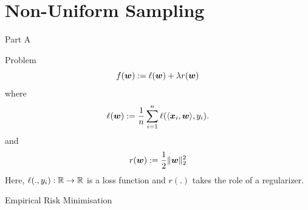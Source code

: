 \section{Non-Uniform Sampling}
\begin{frame}{Part A}
\Large \center{\color{blue}{ Non-Uniform Sampling Algorithms}}
\end{frame}

\begin{frame}{Problem}
\begin{equation}
    \label{eq:primalObjective}
    f(\bm{w}):= \ell(\bm{w})+\lambda r(\bm{w})
\end{equation}
where 
\begin{equation}\label{eq:someEquationName}
    \ell(\bm{w}) := \frac1n \sum_{i=1}^n \ell(\langle \bm{x}_i, \bm{w} \rangle, y_i).
\end{equation}
and 
\begin{equation}
    r(\bm{w}) := \frac12 \|\bm{w}\|_2^2
\end{equation}
Here, $\ell(.,y_i):\mathbb{R}\rightarrow\mathbb{R}$ is a loss function and $r(.)$ takes the role of a regularizer. 
\begin{block}{Empirical Risk Minimisation}
\end{block}
\end{frame}

